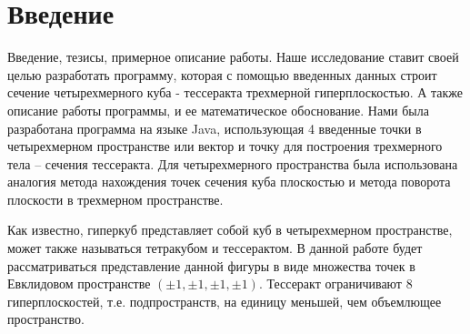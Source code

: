 \documentclass[12pt, a4paper, twoside]{report}
\begin{document}

\tableofcontents

\newpage
\section{Введение}
Введение, тезисы, примерное описание работы.
Наше исследование ставит своей целью разработать программу, которая с помощью введенных данных строит сечение четырехмерного куба - тессеракта трехмерной гиперплоскостью. А также описание работы программы, и ее математическое обоснование. Нами была разработана программа на языке Java, использующая 4 введенные точки в четырехмерном пространстве или вектор и точку для построения трехмерного тела – сечения тессеракта. 
Для четырехмерного пространства была использована аналогия метода нахождения точек сечения куба плоскостью и метода поворота плоскости в трехмерном пространстве.

Как известно, гиперкуб представляет собой куб в четырехмерном пространстве, может также называться тетракубом и тессерактом. В данной работе будет рассматриваться представление данной фигуры в виде множества точек в Евклидовом пространстве $(\pm 1,\pm 1,\pm 1, \pm 1)$. Тессеракт ограничивают 8 гиперплоскостей, т.е. подпространств, на единицу меньшей, чем объемлющее пространство.

\begin{figure}[h!]
	\center
	\clearpage
\end{figure}
\end{document}
